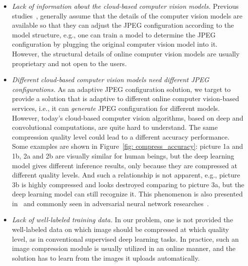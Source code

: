 \begin{itemize}

\item \emph{Lack of information about the cloud-based computer vision models.} Previous studies~\cite{DeepN-JPEG, torfason2018towards, gueguen2018faster}, generally assume that the details of the computer vision models are available so that they can adjust the JPEG configuration according to the model structure, e.g., one can train a model to determine the JPEG configuration by plugging the original computer vision model into it. However, the structural details of online computer vision models are usually proprietary and not open to the users. 

\item \emph{Different cloud-based computer vision models need different JPEG configurations.} As an adaptive JPEG configuration solution, we target to provide a solution that is adaptive to different online computer vision-based services, i.e., it can \emph{generate} JPEG configuration for different models. However, today's cloud-based computer vision algorithms, based on deep and convolutional computations, are quite hard to understand. The same compression quality level could lead to a different accuracy performance. Some examples are shown in Figure~\ref{fig: compress_accuracy}: picture 1a and 1b, 2a and 2b are visually similar for human beings, but the deep learning model gives different inference results, only because they are compressed at different quality levels. And such a relationship is not apparent, e.g., picture 3b is highly compressed and looks destroyed comparing to picture 3a, but the deep learning model can still recognize it. This phenomenon is also presented in~\cite{delac2005effects} and commonly seen in adversarial neural network researches~\cite{yuan2019adversarial, evtimov2018robust}.

\item \emph{Lack of well-labeled training data.} In our problem, one is not provided the well-labeled data on which image should be compressed at which quality level, as in conventional supervised deep learning tasks. In practice, such an image compression module is usually utilized in an online manner, and the solution has to learn from the images it uploads automatically. 
\end{itemize} 

